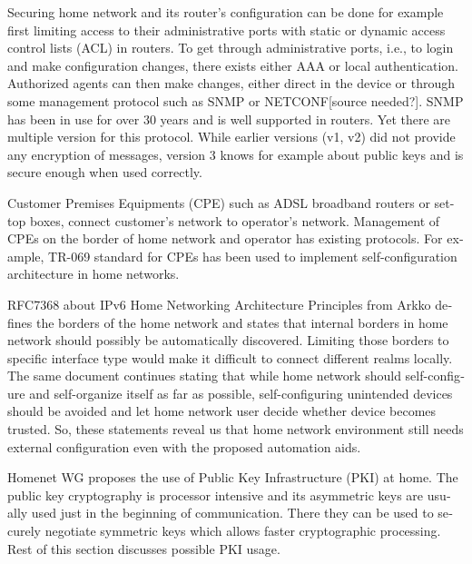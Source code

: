 \documentclass[12pt,a4paper,english]{tutthesis}
\begin{document}
\begin{otherlanguage}{english}
Securing home network and its router's configuration can be done for
example first limiting access to their administrative ports
with static or dynamic access control lists (ACL) in
routers. To get through administrative ports, i.e., to login and make
configuration changes, there exists either AAA or local authentication.
Authorized agents can then make changes, either direct in the device or through some
management protocol such as SNMP or NETCONF[source needed?].  SNMP has been in
use for over 30 years and is well supported in routers. Yet there are
multiple version for this protocol. While earlier versions (v1, v2)
did not provide any encryption of messages, version 3 knows for example
about public keys and is secure enough when used correctly.


Customer Premises Equipments (CPE) such as ADSL broadband routers or
set-top boxes, connect customer's network to operator's network.
Management of CPEs on the border of home network and operator has 
existing protocols. For example, TR-069 standard\cite{iptvtr069} for CPEs
has been used to implement self-configuration archi\-tecture in
home networks\cite{tr069rachidi2011}.


RFC7368 about IPv6 Home Networking Architecture Principles from
Arkko\cite{rfc7368} defines the borders of the home network and states that
internal borders in home network should possibly be automatically
discovered. Limiting those borders to specific
interface type would make it difficult to connect different realms locally.
The same document continues stating
that while home network should self-configure and self-organize itself as
far as possible, self-configuring unintended devices should be
avoided and let home network user decide whether device becomes trusted.
So, these statements reveal us that home network environment still needs
external configuration even with the proposed automation aids.





Homenet WG proposes the use of Public Key Infrastructure (PKI) at 
home. The public key cryptography is processor intensive and its
asymmetric keys are usually used just in the beginning of
communication. There they can be used to securely negotiate symmetric
keys which allows faster cryptographic processing.
Rest of this section discusses possible PKI usage.


\end{otherlanguage}
\end{document}
